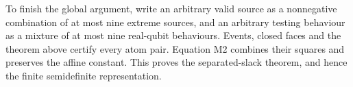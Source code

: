 To finish the global argument, write an arbitrary valid source as a
nonnegative combination of at most nine extreme sources, and an
arbitrary testing behaviour as a mixture of at most nine real-qubit
behaviours. Events, closed faces and the theorem above certify every
atom pair. Equation M2 combines their squares and preserves the affine
constant. This proves the separated-slack theorem, and hence the finite
semidefinite representation.
